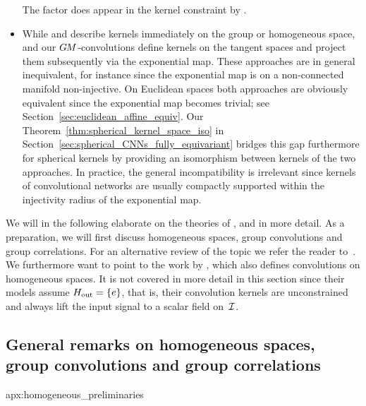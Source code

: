 \begin{itemize}
        The factor does appear in the kernel constraint by \citet{bekkers2020bspline}.
    \item[{\rule[2.2pt]{2pt}{2pt}}]
        While \citet{Kondor2018-GENERAL} and \citet{Cohen2018-intertwiners}\cite{Cohen2019-generaltheory} describe kernels immediately on the group or homogeneous space,
        \citet{bekkers2020bspline} and our $G\mkern-1.4muM$-convolutions define kernels on the tangent spaces and project them subsequently via the exponential map.
        These approaches are in general inequivalent, for instance since the exponential map is on a non-connected manifold non-injective.
        On Euclidean spaces both approaches are obviously equivalent since the exponential map becomes trivial; see Section~\ref{sec:euclidean_affine_equiv}.
        Our Theorem~\ref{thm:spherical_kernel_space_iso} in Section~\ref{sec:spherical_CNNs_fully_equivariant} bridges this gap furthermore for spherical kernels by providing an isomorphism between kernels of the two approaches.
        In practice, the general incompatibility is irrelevant since kernels of convolutional networks are usually compactly supported within the injectivity radius of the exponential map.
\end{itemize}

We will in the following elaborate on the theories of
\citet{Kondor2018-GENERAL}, \citet{bekkers2020bspline} and \citet{Cohen2018-intertwiners}\cite{Cohen2019-generaltheory}
in more detail.
As a preparation, we will first discuss homogeneous spaces, group convolutions and group correlations.
For an alternative review of the topic we refer the reader to~\citet{esteves2020theoretical}.
We furthermore want to point to the work by \citet{chakraborty2018H-CNNs}, which also defines convolutions on homogeneous spaces.
It is not covered in more detail in this section since their models assume $H_{\textup{out}}=\{e\}$, that is, their convolution kernels are unconstrained and always lift the input signal to a scalar field on~$\mathcal{I}$.






\toclesslab\subsection{General remarks on homogeneous spaces, group convolutions and group correlations}{apx:homogeneous_preliminaries}

